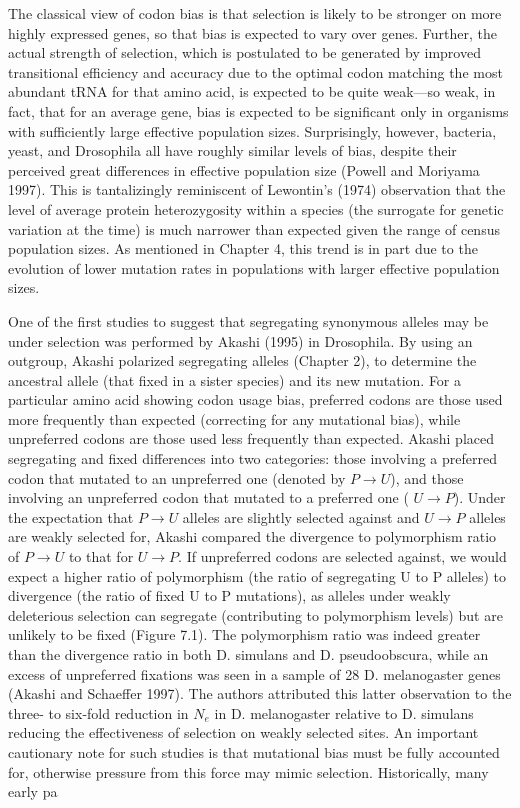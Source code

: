 \documentclass{article}
\begin{document}
The classical view of codon bias is that selection is likely to be stronger on more highly expressed genes, so that bias is expected to vary over genes. Further, the actual strength of selection, which is postulated to be generated by improved transitional efficiency and accuracy due to the optimal codon matching the most abundant tRNA for that amino acid, is expected to be quite weak—so weak, in fact, that for an average gene, bias is expected to be significant only in organisms with sufficiently large effective population sizes. Surprisingly, however, bacteria, yeast, and Drosophila all have roughly similar levels of bias, despite their perceived great differences in effective population size (Powell and Moriyama 1997). This is tantalizingly reminiscent of Lewontin's (1974) observation that the level of average protein heterozygosity within a species (the surrogate for genetic variation at the time) is much narrower than expected given the range of census population sizes. As mentioned in Chapter 4, this trend is in part due to the evolution of lower mutation rates in populations with larger effective population sizes.

One of the first studies to suggest that segregating synonymous alleles may be under selection was performed by Akashi (1995) in Drosophila. By using an outgroup, Akashi polarized segregating alleles (Chapter 2), to determine the ancestral allele (that fixed in a sister species) and its new mutation. For a particular amino acid showing codon usage bias, preferred codons are those used more frequently than expected (correcting for any mutational bias), while unpreferred codons are those used less frequently than expected. Akashi placed segregating and fixed differences into two categories: those involving a preferred codon that mutated to an unpreferred one (denoted by  $ P \rightarrow U $), and those involving an unpreferred codon that mutated to a preferred one ( $ U \rightarrow P $). Under the expectation that  $ P \rightarrow U $ alleles are slightly selected against and  $ U \rightarrow P $ alleles are weakly selected for, Akashi compared the divergence to polymorphism ratio of  $ P \rightarrow U $ to that for  $ U \rightarrow P $. If unpreferred codons are selected against, we would expect a higher ratio of polymorphism (the ratio of segregating U to P alleles) to divergence (the ratio of fixed U to P mutations), as alleles under weakly deleterious selection can segregate (contributing to polymorphism levels) but are unlikely to be fixed (Figure 7.1). The polymorphism ratio was indeed greater than the divergence ratio in both D. simulans and D. pseudoobscura, while an excess of unpreferred fixations was seen in a sample of 28 D. melanogaster genes (Akashi and Schaeffer 1997). The authors attributed this latter observation to the three- to six-fold reduction in  $ N_e $ in D. melanogaster relative to D. simulans reducing the effectiveness of selection on weakly selected sites. An important cautionary note for such studies is that mutational bias must be fully accounted for, otherwise pressure from this force may mimic selection. Historically, many early pa
\end{document}
